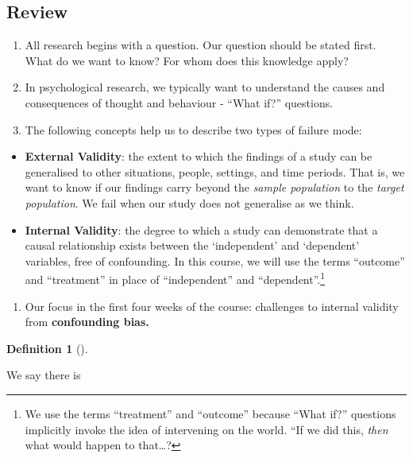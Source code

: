 \documentclass[
  singlecolumn]{article}
\providecommand{\tightlist}{%
  \setlength{\itemsep}{0pt}\setlength{\parskip}{0pt}}\usepackage{longtable,booktabs,array}
\theoremstyle{definition}
\newtheorem{definition}{Definition}[section]
\theoremstyle{remark}
\begin{document}
\subsection{Review}\label{review}

\begin{enumerate}
\def\labelenumi{\arabic{enumi}.}
\item
  All research begins with a question. Our question should be stated
  first. What do we want to know? For whom does this knowledge apply?
\item
  In psychological research, we typically want to understand the causes
  and consequences of thought and behaviour - ``What if?'' questions.
\item
  The following concepts help us to describe two types of failure mode:
\end{enumerate}

\begin{itemize}
\item
  \textbf{External Validity}: the extent to which the findings of a
  study can be generalised to other situations, people, settings, and
  time periods. That is, we want to know if our findings carry beyond
  the \emph{sample population} to the \emph{target population}. We fail
  when our study does not generalise as we think.
\item
  \textbf{Internal Validity}: the degree to which a study can
  demonstrate that a causal relationship exists between the
  `independent' and `dependent' variables, free of confounding. In this
  course, we will use the terms ``outcome'' and ``treatment'' in place
  of ``independent'' and ``dependent''.\footnote{We use the terms
    ``treatment'' and ``outcome'' because ``What if?'' questions
    implicitly invoke the idea of intervening on the world. ``If we did
    this, \emph{then} what would happen to that\ldots?}
\end{itemize}

\begin{enumerate}
\def\labelenumi{\arabic{enumi}.}
\setcounter{enumi}{4}
\tightlist
\item
  Our focus in the first four weeks of the course: challenges to
  internal validity from \textbf{confounding bias.}
\end{enumerate}

\begin{definition}[]\protect\hypertarget{def-confounding}{}\label{def-confounding}

We say there is

\end{definition}
\end{document}
